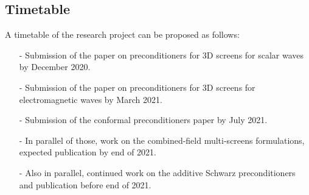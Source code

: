 \documentclass[]{article}
\begin{document}
\subsection*{Timetable}

A timetable of the research project can be proposed as follows:
\begin{itemize}\itemsep-0.2em 
	\item[-] Submission of the paper on preconditioners for 3D screens for scalar waves by December 2020.
	\item[-] Submission of the paper on preconditioners for 3D screens for electromagnetic waves by March 2021.
	\item[-] Submission of the conformal preconditioners paper by July 2021.
	\item[-] In parallel of those, work on the combined-field multi-screens formulations, expected publication by end of 2021. 
	\item[-] Also in parallel, continued work on the additive Schwarz preconditioners and publication before end of 2021.
\end{itemize}
\end{document}
